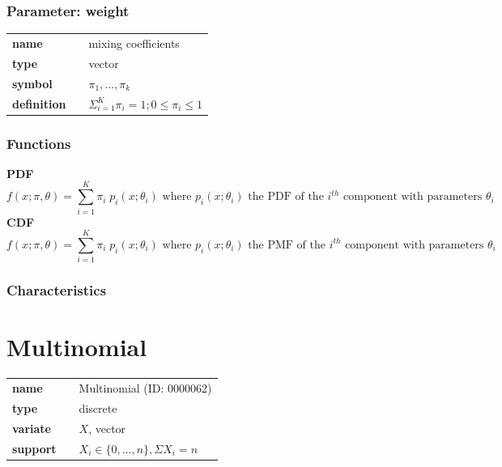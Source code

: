 \subsubsection*{Parameter: weight}

\noindent\begin{tabular}{p{2cm}cl}
\textbf{name} & & mixing coefficients \\
\textbf{type} & & vector \\
\textbf{symbol} & & $\pi_1, \ldots, \pi_k$  \\
\textbf{definition} & & $\Sigma_{i=1}^K \pi_i=1; 0\le \pi_i \le 1$
\end{tabular}
\subsubsection*{Functions}

\smallskip \noindent \hspace{.2cm} \textbf{PDF} 
\begin{equation*}f(x; \pi, \theta) = \sum_{i=1}^{K} \pi_{i}\; p_i(x; \theta_i) \text{ where } p_i(x; \theta_i) \text{ the PDF of the } i^{th} \text{ component with parameters } \theta_i\end{equation*}
\smallskip \noindent \hspace{.2cm} \textbf{CDF} 
\begin{equation*}f(x; \pi, \theta) = \sum_{i=1}^{K} \pi_{i}\; p_i(x; \theta_i) \text{ where } p_i(x; \theta_i) \text{ the PMF of the } i^{th} \text{ component with parameters } \theta_i\end{equation*}
\smallskip
\subsubsection*{Characteristics}
\smallskip
\section*{Multinomial} 

  \bigskip 

\begin{tabular}{p{2cm}cl}
\textbf{name} & & Multinomial (ID: 0000062)\\ 
 
\textbf{type} & & discrete \\ 

\textbf{variate} & & $X$, vector \\ 

\textbf{support} & & $X_i \in \{0,\dots,n\}, \Sigma X_i = n$
\end{tabular}

